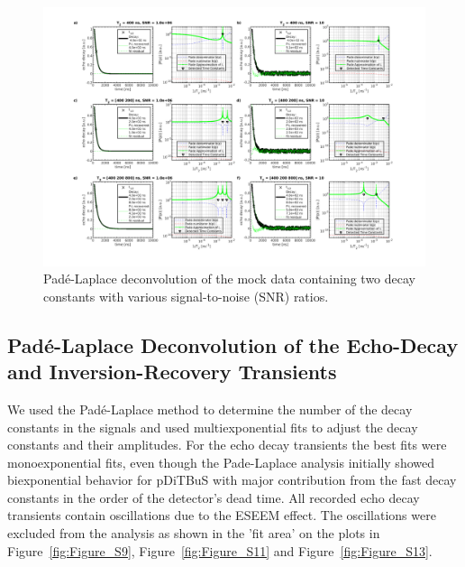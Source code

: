 \begin{figure}[ht!]
\center
	\includegraphics[width=1\textwidth]{./pulse/figures/Figure_S7.pdf}
	\caption{Pad{\'e}-Laplace deconvolution of the mock data containing two decay constants with various signal-to-noise (SNR) ratios.}
	\label{fig:Figure_S7}
\end{figure}


\newpage
\subsection{Pad{\'e}-Laplace Deconvolution of the Echo-Decay and Inversion-Recovery Transients}
\label{pade_laplace_T2}
We used the Pad{\'e}-Laplace method to determine the number of the decay constants in the signals and used multiexponential fits to adjust the decay constants and their amplitudes. For the echo decay transients the best fits were monoexponential fits, even though the Pade-Laplace analysis initially showed biexponential behavior for pDiTBuS with major contribution from the fast decay constants in the order of the detector's dead time. All recorded echo decay transients contain oscillations due to the ESEEM effect. The oscillations were excluded from the analysis as shown in the 'fit area' on the plots in Figure~\ref{fig:Figure_S9}, Figure~\ref{fig:Figure_S11} and Figure~\ref{fig:Figure_S13}.

\newpage

